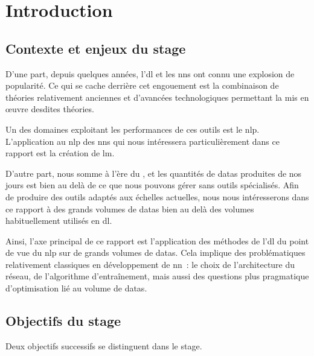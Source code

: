 \chapter{Introduction}

\section[Contexte \& Enjeux]{Contexte et enjeux du stage}

D'une part, depuis quelques années, l'\gls{dl} et les \glspl{nn} ont connu une explosion de popularité.
Ce qui se cache derrière cet engouement est la combinaison de théories relativement anciennes et d'avancées technologiques permettant la mis en œuvre desdites théories.

Un des domaines exploitant les performances de ces outils est le \gls{nlp}.
L'application au \gls{nlp} des \glspl{nn} qui nous intéressera particulièrement dans ce rapport est la création de \gls{lm}.

D'autre part, nous somme à l'ère du \og{}\fg{}, et les quantités de \glspl{data} produites de nos jours est bien au delà de ce que nous pouvons gérer sans outils spécialisés.
Afin de produire des outils adaptés aux échelles actuelles, nous nous intéresserons dans ce rapport à des grands volumes de \glspl{data} bien au delà des volumes habituellement utilisés en \gls{dl}.

Ainsi, l'axe principal de ce rapport est l'application des méthodes de l'\gls{dl} du point de vue du \gls{nlp} sur de grands volumes de \glspl{data}.
Cela implique des problématiques relativement classiques en développement de \gls{nn}~: le choix de l'architecture du réseau, de l'algorithme d'entraînement, mais aussi des questions plus pragmatique d'optimisation lié au volume de \glspl{data}.%

\section[Objectifs]{Objectifs du stage}
Deux objectifs successifs se distinguent dans le stage.

